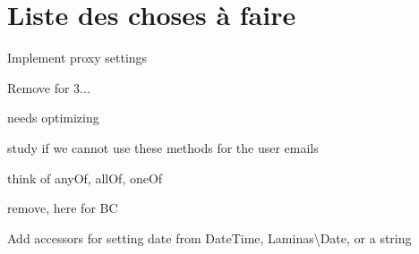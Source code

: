 \chapter{Liste des choses à faire}
\hypertarget{todo}{}\label{todo}

\begin{DoxyRefList}
\item[Class \doxylink{class_laminas_1_1_mail_1_1_protocol_1_1_abstract_protocol}{Abstract\+Protocol} ]\label{todo__todo000017}%
%
Implement proxy settings  
\item[\doxylink{report_8contract_8php_a77b973d137fb33212e018b042df6e3e7}{Global(e)} \doxylink{class_laminas_1_1_mail_1_1_protocol_1_1_abstract_protocol_a232549a2b8760895af81ad9e8a819317}{Abstract\+Protocol\+::\+\_\+connect} (\$remote)]\label{todo__todo000018}%
%
Remove for 3...  
\item[\doxylink{report_8contract_8php_a77b973d137fb33212e018b042df6e3e7}{Global(e)} \doxylink{class_sabre_1_1_card_d_a_v_1_1_address_book_home_a1cfdba129d25b04b73af8290f58ba7c1}{Address\+Book\+Home\+::get\+Child} (\$name)]\label{todo__todo000035}%
%
needs optimizing 
\item[\doxylink{report_8contract_8php_a77b973d137fb33212e018b042df6e3e7}{Global(e)} \doxylink{class_common_d_b_child_aab36d5d745548dfe82b5e9a3df0a6a3d}{Common\+DBChild\+::show\+Add\+Child\+Button\+For\+Item\+Form} (\doxylink{class_common_d_b_t_m}{Common\+DBTM} \$item, \$field\+\_\+name, \$canedit=null, \$display=true)]\label{todo__todo000001}%
%
study if we cannot use these methods for the user emails  
\item[Class \doxylink{class_swaggest_1_1_json_schema_1_1_structure_1_1_composition}{Composition} ]\label{todo__todo000048}%
%
think of any\+Of, all\+Of, one\+Of  
\item[\doxylink{report_8contract_8php_a77b973d137fb33212e018b042df6e3e7}{Global(e)} \doxylink{class_laminas_1_1_validator_1_1_csrf_a644968433a8fda03fa2380482b10b247}{Csrf\+::get\+Validation\+Token} (\$token\+Id=null)]\label{todo__todo000027}%
%
remove, here for BC  
\item[Class \doxylink{class_laminas_1_1_mail_1_1_header_1_1_date}{Date} ]\label{todo__todo000009}%
%
Add accessors for setting date from Date\+Time, Laminas\textbackslash{}\+Date, or a string  

\end{DoxyRefList}
